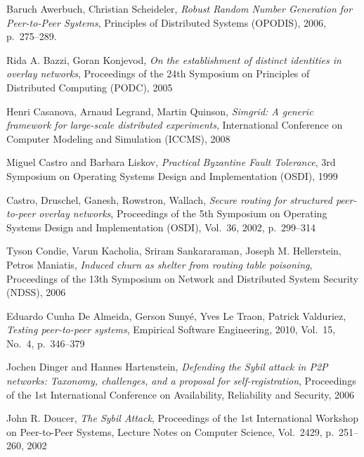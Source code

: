 \begin{thebibliography}{99}

  Baruch Awerbuch, Christian Scheideler,
  \textit{Robust Random Number Generation for Peer-to-Peer Systems},
  Principles of Distributed Systems (OPODIS), 
  2006,
  p.~275--289.

  Rida A. Bazzi, Goran Konjevod,
  \textit{On the establishment of distinct identities in overlay networks},
  Proceedings of the 24th Symposium on Principles of Distributed Computing
  (PODC),
  2005


  Henri Casanova, Arnaud Legrand, Martin Quinson,
  \textit{Simgrid: A generic framework for large-scale distributed experiments},
  International Conference on Computer Modeling and Simulation (ICCMS),
  2008

  Miguel Castro and Barbara Liskov,
  \textit{Practical Byzantine Fault Tolerance},
  3rd Symposium on Operating Systems Design and Implementation (OSDI),
  1999


 Castro, Druschel, Ganesh, Rowstron, Wallach,
  \textit{Secure routing for structured peer-to-peer overlay networks},
  Proceedings of the 5th Symposium on Operating Systems Design and
  Implementation (OSDI),
  Vol.~36,
  2002,
  p.~299--314

  Tyson Condie, Varun Kacholia, Sriram Sankararaman, Joseph M. Hellerstein,
  Petros Maniatis,
  \textit{Induced churn as shelter from routing table poisoning},
  Proceedings of the 13th Symposium on Network and Distributed System Security
  (NDSS),
  2006

  Eduardo Cunha De Almeida, Gerson Suny{\'e}, Yves Le Traon, Patrick Valduriez,
  \textit{Testing peer-to-peer systems},
  Empirical Software Engineering, 2010, Vol.~15, No.~4, p.~346--379
 
  Jochen Dinger and Hannes Hartenstein,
  \textit{Defending the Sybil attack in P2P networks: Taxonomy, challenges, and
  a proposal for self-registration},
  Proceedings of the 1st International Conference on Availability, Reliability
  and Security,
  2006

 John R. Doucer,
  \textit{The Sybil Attack},
  Proceedings of the 1st International Workshop on Peer-to-Peer Systems,
  Lecture Notes on Computer Science, Vol.~2429, p.~251--260,
  2002


\end{thebibliography}
